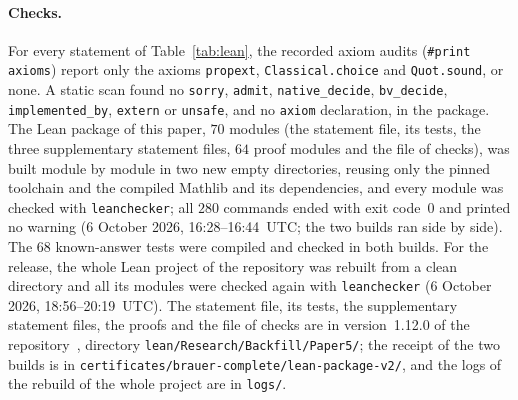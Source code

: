 \documentclass[11pt]{article}
\theoremstyle{remark}
\newcommand{\repoversion}{1.12.0}
\begin{document}
\paragraph{Checks.}
For every statement of Table~\ref{tab:lean}, the recorded axiom audits
(\texttt{\#print axioms}) report only the axioms \texttt{propext},
\texttt{Classical.choice} and \texttt{Quot.sound}, or none. A static scan found
no \texttt{sorry}, \texttt{admit}, \texttt{native\_decide}, \texttt{bv\_decide},
\texttt{implemented\_by}, \texttt{extern} or \texttt{unsafe}, and no
\texttt{axiom} declaration, in the package. The Lean package of this paper,
$70$ modules (the statement file, its tests, the three supplementary statement
files, $64$ proof modules and the file of checks), was built module by module
in two new empty directories, reusing only the pinned toolchain and the
compiled Mathlib and its dependencies, and every module was checked with
\texttt{leanchecker}; all $280$ commands ended with exit code~$0$ and printed
no warning (6 October 2026, 16:28--16:44~UTC; the two builds ran side by side).
The $68$ known-answer tests were compiled and checked in both builds.
For the release, the whole Lean project of the repository was rebuilt from a
clean directory and all its modules were checked again with
\texttt{leanchecker} (6 October 2026, 18:56--20:19~UTC). The statement file,
its tests, the supplementary statement files, the proofs and the file of checks
are in version~\repoversion{} of the repository~\cite{repo}, directory
\texttt{lean/Research/Backfill/Paper5/}; the receipt of the two builds is in
\texttt{certificates/brauer-complete/lean-package-v2/}, and the logs of the
rebuild of the whole project are in \texttt{logs/}.
\end{document}
